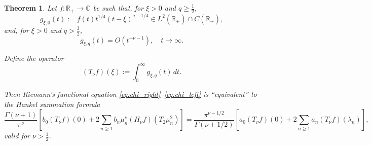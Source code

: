 \documentclass[11pt]{article}
\theoremstyle{plain}
\newtheorem{theorem}{Theorem}
\begin{document}
\begin{theorem}
\label{thm:riemann_functional}
Let $f : \mathbb{R}_+ \to \mathbb{C}$ be such that, for $\xi > 0$ and $q \geq \frac{1}{2}$,
\begin{equation}
g_{\xi,0}(t) := f(t) t^{1/4} (t-\xi)^{q-1/4} \in L^2(\mathbb{R}_+) \cap C(\mathbb{R}_+),
\label{eq:hankel_condition_1}
\end{equation}
and, for $\xi > 0$ and $q > \frac{3}{2}$,
\begin{equation}
g_{\xi,q}(t) = O(t^{-\nu-1}), \quad t \to \infty.
\label{eq:hankel_condition_2}
\end{equation}

Define the operator
\begin{equation}
(T_\nu f)(\xi) := \int_0^\infty g_{\xi,q}(t) \, dt.
\label{eq:operator_definition}
\end{equation}

Then Riemann's functional equation \eqref{eq:chi_right}--\eqref{eq:chi_left} is ``equivalent'' to the Hankel summation formula
\begin{equation}
\frac{\Gamma(\nu+1)}{\pi^\nu} \left[ b_0 (T_\nu f)(0) + 2\sum_{n \geq 1} b_n \mu_n^\nu (H_\nu f)(T_2 \mu_n^2) \right]
= \frac{\pi^{\nu-1/2}}{\Gamma(\nu+1/2)} \left[ a_0 (T_\nu f)(0) + 2\sum_{n \geq 1} a_n (T_\nu f)(\lambda_n) \right],
\label{eq:hankel_summation_formula}
\end{equation}
valid for $\nu > \frac{1}{2}$.
\end{theorem}
\end{document}
